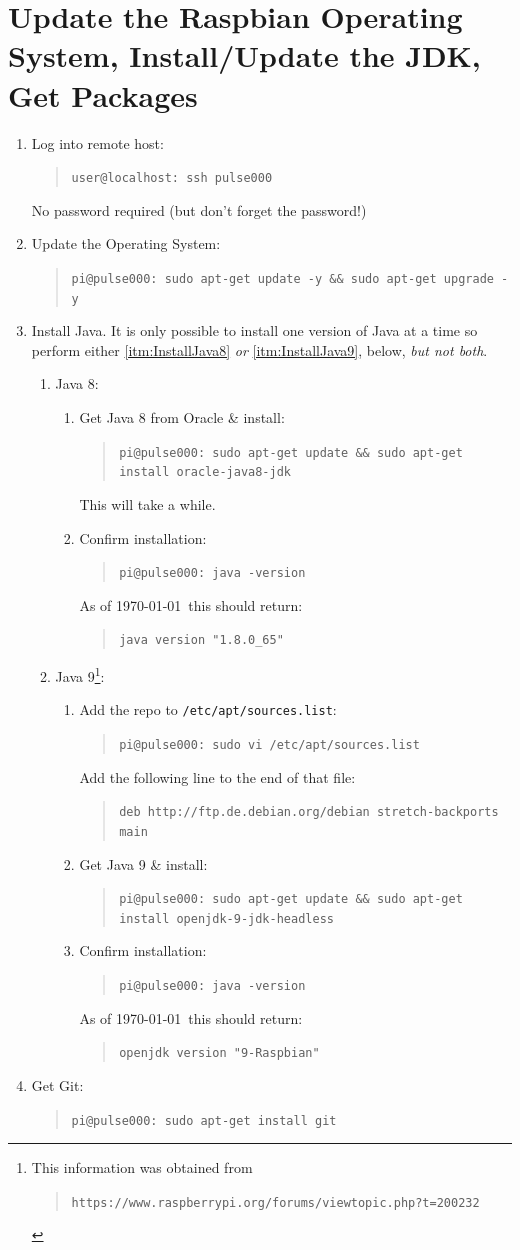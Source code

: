 \documentclass[11pt,oneside]{article}
\makeatletter
\newcommand{\localCommand}[1]{\begin{quote} \texttt{user@localhost: #1} \end{quote}}
\newcommand{\remoteCommandAfterRename}[1]{\begin{quote} \texttt{pi@pulse000: #1} \end{quote}}
\newcommand{\myurl}[1]{\begin{quote} \texttt{#1} \end{quote}}
\newcommand{\xtermPartialOutput}[1]{\begin{verse} \texttt{#1} \end{verse}}
\makeatother
\begin{document}
\section{Update the Raspbian Operating System, Install/Update the JDK, Get Packages}
\begin{enumerate}
	\item Log into remote host: \localCommand{ssh pulse000}
	No password required (but don't forget the password!)
	\item Update the Operating System: \remoteCommandAfterRename{sudo apt-get update -y \&\& sudo apt-get upgrade -y}
	\item Install Java.  It is only possible to install one version of Java at a time so perform either \ref{itm:InstallJava8} {\em or} \ref{itm:InstallJava9}, below, {\em but not both}.
	\begin{enumerate}
		\item Java 8: \label{itm:InstallJava8}
		\begin{enumerate}
			\item Get Java 8 from Oracle \& install: \remoteCommandAfterRename{sudo apt-get update \&\& sudo apt-get install oracle-java8-jdk}  This
			will take a while.
			\item Confirm installation: \remoteCommandAfterRename{java -version}  As of \today\ this should return: \xtermPartialOutput{java version "1.8.0\_65"}
		\end{enumerate}
		\item Java 9\footnote{This information was obtained from \myurl{https://www.raspberrypi.org/forums/viewtopic.php?t=200232}}: \label{itm:InstallJava9}
		\begin{enumerate}
			\item Add the repo to \texttt{/etc/apt/sources.list}: \remoteCommandAfterRename{sudo vi /etc/apt/sources.list}  Add the following 
			line to the end of that file: \xtermPartialOutput{deb http://ftp.de.debian.org/debian stretch-backports main}
			\item Get Java 9 \& install: \remoteCommandAfterRename{sudo apt-get update \&\& sudo apt-get install openjdk-9-jdk-headless}
			\item Confirm installation: \remoteCommandAfterRename{java -version}  As of \today\ this should return: \xtermPartialOutput{openjdk version "9-Raspbian"}
		\end{enumerate}
	\end{enumerate}
	\item Get Git: \remoteCommandAfterRename{sudo apt-get install git}

\end{enumerate}
\end{document}
